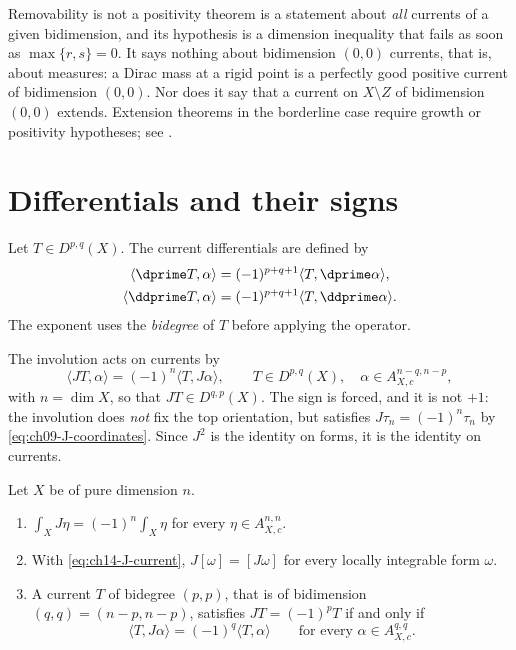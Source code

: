 \begin{warning}{Removability is not a positivity theorem}
 is a statement about \emph{all} currents of
a given bidimension, and its hypothesis is a dimension inequality that fails
as soon as $\max\{r,s\}=0$.  It says nothing about bidimension $(0,0)$
currents, that is, about measures: a Dirac mass at a rigid point is a
perfectly good positive current of bidimension $(0,0)$.  Nor does it say that
a current on $X\setminus Z$ of bidimension $(0,0)$ extends.  Extension
theorems in the borderline case require growth or positivity hypotheses; see
.
\end{warning}

\section{Differentials and their signs}
\label{sec:ch14-differentials}

Let $T\in D^{p,q}(X)$.  The current differentials are defined by
\[
\begin{aligned}
 \langle\dprime T,\alpha\rangle
   &=(-1)^{p+q+1}\langle T,\dprime\alpha\rangle,\\
 \langle\ddprime T,\alpha\rangle
   &=(-1)^{p+q+1}\langle T,\ddprime\alpha\rangle.
\end{aligned}
\]
The exponent uses the \emph{bidegree} of $T$ before applying the operator.

The involution acts on currents by
\begin{equation}
\label{eq:ch14-J-current}
  \langle JT,\alpha\rangle=(-1)^n\langle T,J\alpha\rangle,
 \qquad T\in D^{p,q}(X),\quad\alpha\in A_{X,c}^{n-q,n-p},
\end{equation}
with $n=\dim X$, so that $JT\in D^{q,p}(X)$.  The sign is forced, and it is
not $+1$: the involution does
\emph{not} fix the top orientation, but satisfies $J\tau_n=(-1)^n\tau_n$ by
\eqref{eq:ch09-J-coordinates}.  Since $J^2$ is the identity on forms, it is
the identity on currents.

\begin{lemma}
\label{lem:ch14-J-currents}
Let $X$ be of pure dimension $n$.
\begin{enumerate}
\item $\int_XJ\eta=(-1)^n\int_X\eta$ for every $\eta\in A_{X,c}^{n,n}$.
\item With \eqref{eq:ch14-J-current}, $J[\omega]=[J\omega]$ for every locally
  integrable form $\omega$.
\item A current $T$ of bidegree $(p,p)$, that is of bidimension
  $(q,q)=(n-p,n-p)$, satisfies $JT=(-1)^pT$ if and only if
  \[
   \langle T,J\alpha\rangle=(-1)^q\langle T,\alpha\rangle
   \qquad\text{for every }\alpha\in A_{X,c}^{q,q}.
  \]
\end{enumerate}
\end{lemma}

